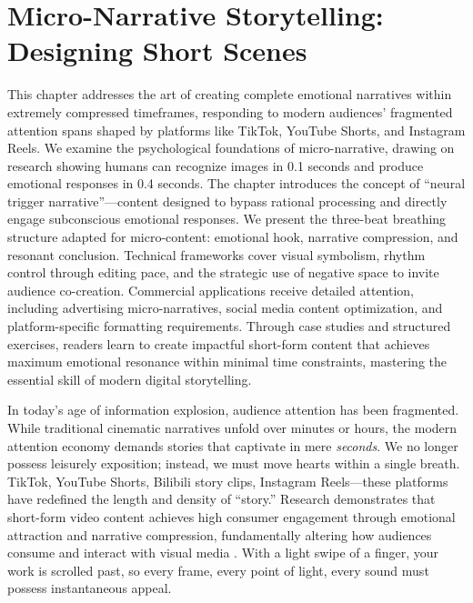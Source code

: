 \chapter{Micro-Narrative Storytelling: Designing Short Scenes}
\label{ch:short-scenes}

\begin{chapterabstract}
This chapter addresses the art of creating complete emotional narratives within extremely compressed timeframes, responding to modern audiences' fragmented attention spans shaped by platforms like TikTok, YouTube Shorts, and Instagram Reels. We examine the psychological foundations of micro-narrative, drawing on research showing humans can recognize images in 0.1 seconds and produce emotional responses in 0.4 seconds. The chapter introduces the concept of ``neural trigger narrative''—content designed to bypass rational processing and directly engage subconscious emotional responses. We present the three-beat breathing structure adapted for micro-content: emotional hook, narrative compression, and resonant conclusion. Technical frameworks cover visual symbolism, rhythm control through editing pace, and the strategic use of negative space to invite audience co-creation. Commercial applications receive detailed attention, including advertising micro-narratives, social media content optimization, and platform-specific formatting requirements. Through case studies and structured exercises, readers learn to create impactful short-form content that achieves maximum emotional resonance within minimal time constraints, mastering the essential skill of modern digital storytelling.
\end{chapterabstract}

In today's age of information explosion, audience attention has been fragmented. While traditional cinematic narratives unfold over minutes or hours, the modern attention economy demands stories that captivate in mere \textit{seconds}. We no longer possess leisurely exposition; instead, we must move hearts within a single breath. TikTok, YouTube Shorts, Bilibili story clips, Instagram Reels—these platforms have redefined the length and density of ``story.'' Research demonstrates that short-form video content achieves high consumer engagement through emotional attraction and narrative compression, fundamentally altering how audiences consume and interact with visual media \citep{manic2024short}. With a light swipe of a finger, your work is scrolled past, so every frame, every point of light, every sound must possess instantaneous appeal.

